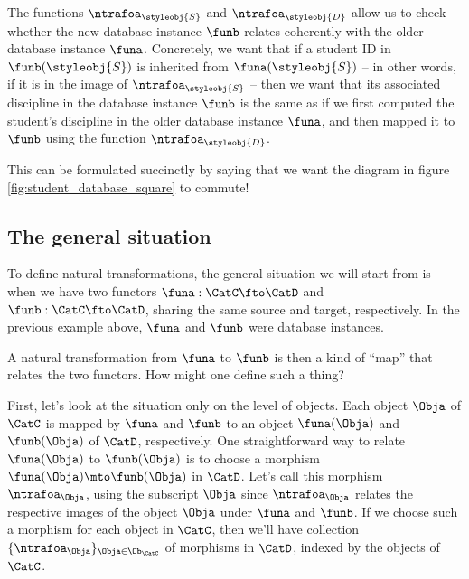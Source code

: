 The functions $\ntrafoa_\styleobj{S}$ and $\ntrafoa_\styleobj{D}$ allow us to check whether the new database instance $\funb$ relates coherently with the older database instance $\funa$.
Concretely, we want that if a student ID in $ \funb(\styleobj{S})$ is inherited from $\funa(\styleobj{S})$ -- in other words, if it is in the image of $\ntrafoa_{\styleobj{S}}$ --  then we want that its associated discipline in the database instance $\funb$ is the same as if we first computed the student's discipline in the older database instance $\funa$, and then mapped it to $\funb$ using the function $\ntrafoa_{\styleobj{D}}$.

%
\begin{marginfigure}
    \centering
    \caption{}
    \label{fig:student_database_square}
\end{marginfigure}
%

This can be formulated succinctly by saying that we want the diagram in figure \cref{fig:student_database_square} to commute!

\subsection{The general situation}

To define natural transformations, the general situation we will start from is when we have two functors $\funa : \CatC \fto \CatD$  and $\funb : \CatC \fto \CatD$, sharing the same source and target, respectively.
In the previous example above, $\funa$ and $\funb$ were database instances.

A natural transformation from $\funa$ to $\funb$ is then a kind of ``map'' that relates the two functors.
How might one define such a thing?

First, let's look at the situation only on the level of objects.
Each object $\Obja$ of $\CatC$ is mapped by $\funa$ and $\funb$ to an object $\funa(\Obja)$ and $\funb(\Obja)$ of $\CatD$, respectively.
One straightforward way to relate $\funa(\Obja)$ to $\funb(\Obja)$ is to choose a morphism $\funa(\Obja) \mto \funb(\Obja)$ in $\CatD$.
Let's call this morphism $\ntrafoa_{\Obja}$, using the subscript $\Obja$ since $\ntrafoa_{\Obja}$ relates the respective images of the object $\Obja$ under $\funa$ and $\funb$.
If we choose such a morphism for each object in $\CatC$, then we'll have collection $\{ \ntrafoa_\Obja \}_{\Obja \in \Ob_\CatC}$ of morphisms in $\CatD$, indexed by the objects of $\CatC$.

